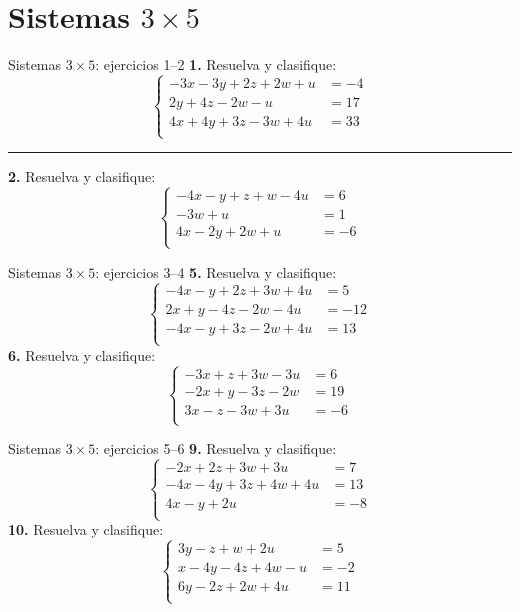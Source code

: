 \documentclass[aspectratio=169]{beamer}
\begin{document}
\section{Sistemas $3\times 5$}
\begin{frame}{Sistemas $3\times 5$: ejercicios 1--2}
\scriptsize
\textbf{1.} Resuelva y clasifique:
\[\left\{\begin{aligned}
-3x-3y+2z+2w+u&=-4\\
2y+4z-2w-u&=17\\
4x+4y+3z-3w+4u&=33\\
\end{aligned}\right.\]
\vspace{0.2em}\hrule\vspace{0.3em}
\textbf{2.} Resuelva y clasifique:
\[\left\{\begin{aligned}
-4x-y+z+w-4u&=6\\
-3w+u&=1\\
4x-2y+2w+u&=-6\\
\end{aligned}\right.\]
\end{frame}
\begin{frame}{Sistemas $3\times 5$: ejercicios 3--4}
\scriptsize
\textbf{5.} Resuelva y clasifique:
\[\left\{\begin{aligned}
-4x-y+2z+3w+4u&=5\\
2x+y-4z-2w-4u&=-12\\
-4x-y+3z-2w+4u&=13\\
\end{aligned}\right.\]
\textbf{6.} Resuelva y clasifique:
\[\left\{\begin{aligned}
-3x+z+3w-3u&=6\\
-2x+y-3z-2w&=19\\
3x-z-3w+3u&=-6\\
\end{aligned}\right.\]
\end{frame}
\begin{frame}{Sistemas $3\times 5$: ejercicios 5--6}
\scriptsize
\textbf{9.} Resuelva y clasifique:
\[\left\{\begin{aligned}
-2x+2z+3w+3u&=7\\
-4x-4y+3z+4w+4u&=13\\
4x-y+2u&=-8\\
\end{aligned}\right.\]
\textbf{10.} Resuelva y clasifique:
\[\left\{\begin{aligned}
3y-z+w+2u&=5\\
x-4y-4z+4w-u&=-2\\
6y-2z+2w+4u&=11\\
\end{aligned}\right.\]
\end{frame}
\end{document}
